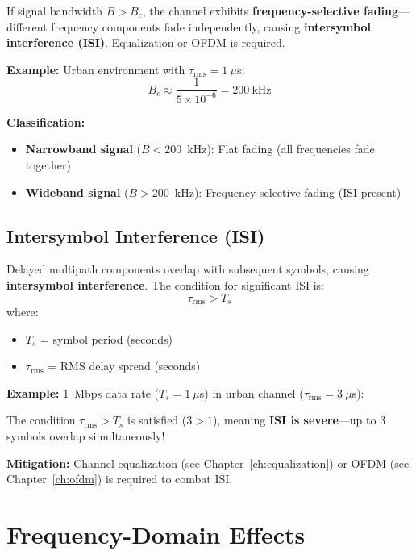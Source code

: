 \begin{warningbox}
If signal bandwidth $B > B_c$, the channel exhibits \textbf{frequency-selective fading}---different frequency components fade independently, causing \textbf{intersymbol interference (ISI)}. Equalization or OFDM is required.
\end{warningbox}

\textbf{Example:} Urban environment with $\tau_{\text{rms}} = 1~\mu$s:
\begin{equation}
B_c \approx \frac{1}{5 \times 10^{-6}} = 200~\text{kHz}
\end{equation}

\textbf{Classification:}
\begin{itemize}
\item \textbf{Narrowband signal} ($B < 200$~kHz): Flat fading (all frequencies fade together)
\item \textbf{Wideband signal} ($B > 200$~kHz): Frequency-selective fading (ISI present)
\end{itemize}

\subsection{Intersymbol Interference (ISI)}

Delayed multipath components overlap with subsequent symbols, causing \textbf{intersymbol interference}. The condition for significant ISI is:
\begin{equation}
\tau_{\text{rms}} > T_s
\end{equation}
where:
\begin{itemize}
\item $T_s$ = symbol period (seconds)
\item $\tau_{\text{rms}}$ = RMS delay spread (seconds)
\end{itemize}

\textbf{Example:} 1~Mbps data rate ($T_s = 1~\mu$s) in urban channel ($\tau_{\text{rms}} = 3~\mu$s):

The condition $\tau_{\text{rms}} > T_s$ is satisfied ($3 > 1$), meaning \textbf{ISI is severe}---up to 3 symbols overlap simultaneously!

\textbf{Mitigation:} Channel equalization (see Chapter~\ref{ch:equalization}) or OFDM (see Chapter~\ref{ch:ofdm}) is required to combat ISI.

\section{Frequency-Domain Effects}

